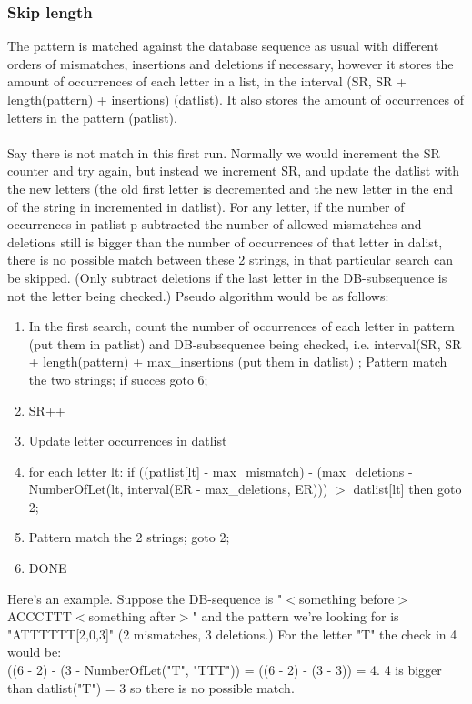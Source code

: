 \documentclass[12pt]{article}
\begin{document}
\subsubsection{Skip length}
The pattern is matched against the database sequence as usual with different orders of mismatches, insertions and
deletions if necessary, however it stores the amount of occurrences of each letter in a list, in the interval
(SR, SR + length(pattern) + insertions) (datlist). 
It also stores the amount of occurrences of letters in the pattern (patlist). \\ \\
Say there is not match in this first run. Normally we would increment the SR counter and try again, but instead we
increment SR, and update the datlist with the new letters (the old first letter is decremented and the new letter in the
end of the string in incremented in datlist). For any letter, if the number of occurrences in patlist p subtracted the
number of allowed mismatches and deletions still is bigger than the number of occurrences of that letter in dalist, there is no 
possible match between these 2 strings, in that particular search can be skipped. (Only subtract deletions if the last letter
in the DB-subsequence is not the letter being checked.) Pseudo algorithm would be as follows: 
\begin{enumerate}
\item In the first search, count the number of occurrences of each letter in pattern (put them in patlist) 
and DB-subsequence being checked, i.e. interval(SR, SR + length(pattern) + max\_insertions (put them in datlist)
; Pattern match the two strings; if succes goto 6;
\item SR++
\item Update letter occurrences in datlist
\item for each letter lt: if ((patlist[lt] - max\_mismatch) - (max\_deletions - 
NumberOfLet(lt, interval(ER - max\_deletions, ER))) $>$ datlist[lt] then goto 2;
\item Pattern match the 2 strings; goto 2;
\item DONE
\end{enumerate}
Here's an example. Suppose the DB-sequence is "$<$something before$>$ACCCTTT$<$something after$>$" and the pattern we're
looking for is "ATTTTTT[2,0,3]" (2 mismatches, 3 deletions.) For the letter "T" the check in 4 would be: \\
((6 - 2) - (3 - NumberOfLet("T", "TTT")) = ((6 - 2) - (3 - 3)) = 4. 4 is bigger than datlist("T") = 3 so there is no
possible match.
\end{document}
